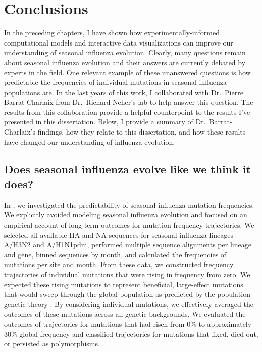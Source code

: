 \chapter{Conclusions}

In the preceding chapters, I have shown how experimentally-informed computational models and interactive data visualizations can improve our understanding of seasonal influenza evolution.
Clearly, many questions remain about seasonal influenza evolution and their answers are currently debated by experts in the field.
One relevant example of these unanswered questions is how predictable the frequencies of individual mutations in seasonal influenza populations are.
In the last years of this work, I collaborated with Dr.\ Pierre Barrat-Charlaix from Dr.\ Richard Neher's lab to help answer this question.
The results from this collaboration provide a helpful counterpoint to the results I've presented in this dissertation.
Below, I provide a summary of Dr.\ Barrat-Charlaix's findings, how they relate to this dissertation, and how these results have changed our understanding of influenza evolution.

\section{Does seasonal influenza evolve like we think it does?}

In \citet{Barrat-Charlaix2020}, we investigated the predictability of seasonal influenza mutation frequencies.
We explicitly avoided modeling seasonal influenza evolution and focused on an empirical account of long-term outcomes for mutation frequency trajectories.
We selected all available HA and NA sequences for seasonal influenza lineages A/H3N2 and A/H1N1pdm, performed multiple sequence alignments per lineage and gene, binned sequences by month, and calculated the frequencies of mutations per site and month.
From these data, we constructed frequency trajectories of individual mutations that were rising in frequency from zero.
We expected these rising mutations to represent beneficial, large-effect mutations that would sweep through the global population as predicted by the population genetic theory \citep{Neher2013}.
By considering individual mutations, we effectively averaged the outcomes of these mutations across all genetic backgrounds.
We evaluated the outcomes of trajectories for mutations that had risen from 0\% to approximately 30\% global frequency and classified trajectories for mutations that fixed, died out, or persisted as polymorphisms.

